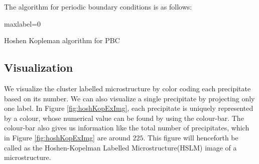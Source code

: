 \documentclass[12pt, a4paper]{report}
\begin{document}
The algorithm for periodic boundary conditions is as follows:

\begin{algorithm}[H]
\SetAlgoLined
{}
 maxlabel=0\;
 \caption{Hoshen Kopleman algorithm for PBC}
\end{algorithm}

\subsection{Visualization}
We visualize the cluster labelled microstructure by color coding each precipitate based on its number. We can also visualize a single precipitate by projecting only one label. In Figure \ref{fig:hoshKopExImg}, each precipitate is uniquely represented by a colour, whose numerical value can be found by using the colour-bar. The colour-bar also gives us information like the total number of precipitates, which in Figure \ref{fig:hoshKopExImg} are around $225$. This figure will henceforth be called as the Hoshen-Kopelman Labelled Microstructure(HSLM) image of a microstructure.
\end{document}
